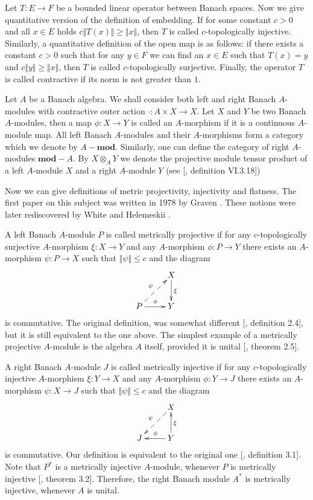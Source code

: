 \documentclass[12pt]{article}
\begin{document}
Let $T:E\to F$ be a bounded linear operator between Banach spaces. Now we give 
quantitative version of the definition of embedding. If for some 
constant $c>0$ and all $x\in E$ holds $c\Vert T(x)\Vert\geq \Vert x\Vert$, 
then $T$ is called $c$-topologically injective. Similarly, a quantitative 
definition of the open map is as follows: if there exists a 
constant $c>0$ such that for any $y\in F$ we can find an $x\in E$ such 
that $T(x)=y$ and $c\Vert y\Vert\geq \Vert x\Vert$, then $T$ is 
called $c$-topologically surjective. Finally, the operator $T$ is 
called contractive if its norm is not greater than $1$.

Let $A$ be a Banach algebra. We shall consider both left and right 
Banach $A$-modules with contractive outer action $\cdot:A\times X\to X$. 
Let $X$ and $Y$ be two Banach $A$-modules, then a map $\phi:X\to Y$ is called 
an $A$-morphism if it is a continuous $A$-module map. All left 
Banach $A$-modules and their $A$-morphisms form a category which we denote 
by $A-\mathbf{mod}$. Similarly, one can define the category of 
right $A$-modules $\mathbf{mod}-A$. By $X\otimes_A Y$ we denote the projective 
module tensor product of a left $A$-module $X$ and a 
right $A$-module $Y$ (see [\cite{HelBanLocConvAlg}, definition VI.3.18]) 

Now we can give definitions of metric projectivity, injectivity and flatness.
The first paper on this subject was written in 1978 by 
Graven \cite{GravInjProjBanMod}. These notions were later rediscovered by 
White \cite{WhiteInjmoduAlg} and 
Helemeskii \cite{HelMetrFrQMod,HelMetrFlatNorMod}.

A left Banach $A$-module $P$ is called metrically projective if for 
any $c$-topologically surjective $A$-morphism $\xi:X\to Y$ and any
$A$-morphism $\phi:P\to Y$ there exists an $A$-morphism $\psi:P\to X$ such that
$\Vert\psi\Vert\leq c$ and the diagram
$$
    \xymatrix{
    & {X} \ar[d]^{\xi}\\  %
    {P} \ar@{-->}[ur]^{\psi} \ar[r]^{\phi} &{Y}}  %
$$
is commutative. The original definition, was somewhat 
different [\cite{GravInjProjBanMod}, definition 2.4], but it is still equivalent
to the one above. The simplest example of a metrically projective $A$-module is 
the algebra $A$ itself, provided it is 
unital [\cite{GravInjProjBanMod}, theorem 2.5]. 

A right Banach $A$-module $J$ is called metrically injective if for 
any $c$-topologically injective $A$-morphism $\xi:Y\to X$ and any
$A$-morphism $\phi:Y\to J$ there exists an $A$-morphism $\psi:X\to J$ such that
$\Vert\psi\Vert\leq c$ and the diagram
\[
    \xymatrix{
    & {X} \ar@{-->}[dl]_{\psi} \\  %
    {J} &{Y} \ar[l]_{\phi} \ar[u]_{\xi}}  %
\]
is commutative. Our definition is equivalent to the original 
one [\cite{GravInjProjBanMod}, definition 3.1]. Note that $P^*$ is a metrically 
injective $A$-module, whenever $P$ is metrically 
injective [\cite{GravInjProjBanMod}, theorem 3.2]. Therefore, the right Banach 
module $A^*$ is metrically injective, whenever $A$ is unital. 
\end{document}
